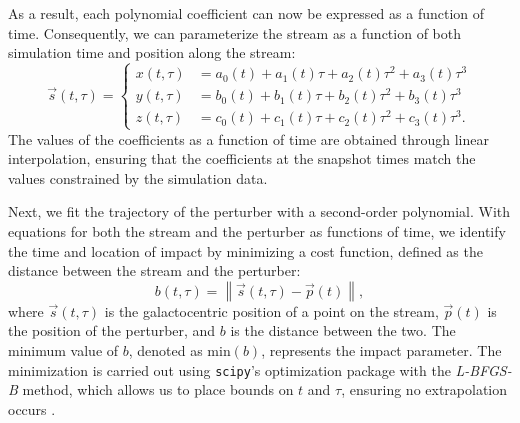\documentclass{aa}
\begin{document}
\begin{appendix}
      As a result, each polynomial coefficient can now be expressed as a function of time. Consequently, we can parameterize the stream as a function of both simulation time and position along the stream:
      \begin{equation}
        \vec{s}(t,\tau) = 
        \left\{
        \begin{aligned}
          x(t,\tau) &= a_0(t) + a_1(t)\tau + a_2(t) \tau^2 + a_3(t)\tau^3 \\ 
          y(t,\tau) &= b_0(t) + b_1(t)\tau + b_2(t) \tau^2 + b_3(t)\tau^3 \\
          z(t,\tau) &= c_0(t) + c_1(t)\tau + c_2(t) \tau^2 + c_3(t)\tau^3.
          \end{aligned}
        \right.
      \end{equation}
      The values of the coefficients as a function of time are obtained through linear interpolation, ensuring that the coefficients at the snapshot times match the values constrained by the simulation data.

      Next, we fit the trajectory of the perturber with a second-order polynomial. With equations for both the stream and the perturber as functions of time, we identify the time and location of impact by minimizing a cost function, defined as the distance between the stream and the perturber:
      \begin{equation} 
        b(t, \tau) = \left\lVert \vec{s}(t, \tau) - \vec{p}(t) \right\rVert, 
        \end{equation}
      where $\vec{s}(t, \tau)$ is the galactocentric position of a point on the stream, $\vec{p}(t)$ is the position of the perturber, and $b$ is the distance between the two. The minimum value of $b$, denoted as $\text{min}(b)$, represents the impact parameter. The minimization is carried out using \texttt{scipy}'s optimization package with the \textit{L-BFGS-B} method, which allows us to place bounds on $t$ and $\tau$, ensuring no extrapolation occurs \citep{davidon1991variable}.


\end{appendix}
\end{document}
